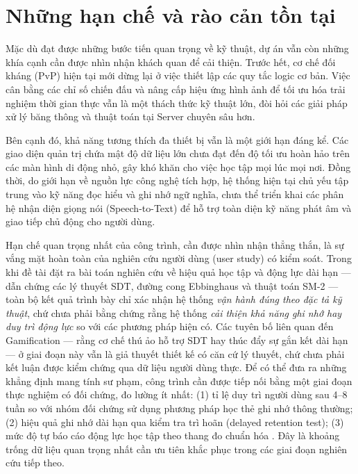 \section{Những hạn chế và rào cản tồn tại}

Mặc dù đạt được những bước tiến quan trọng về kỹ thuật, dự án vẫn còn những khía cạnh cần được nhìn nhận khách quan để cải thiện. Trước hết, cơ chế đối kháng (PvP) hiện tại mới dừng lại ở việc thiết lập các quy tắc logic cơ bản. Việc cân bằng các chỉ số chiến đấu và nâng cấp hiệu ứng hình ảnh để tối ưu hóa trải nghiệm thời gian thực vẫn là một thách thức kỹ thuật lớn, đòi hỏi các giải pháp xử lý băng thông và thuật toán tại Server chuyên sâu hơn.

Bên cạnh đó, khả năng tương thích đa thiết bị vẫn là một giới hạn đáng kể. Các giao diện quản trị chứa mật độ dữ liệu lớn chưa đạt đến độ tối ưu hoàn hảo trên các màn hình di động nhỏ, gây khó khăn cho việc học tập mọi lúc mọi nơi. Đồng thời, do giới hạn về nguồn lực công nghệ tích hợp, hệ thống hiện tại chủ yếu tập trung vào kỹ năng đọc hiểu và ghi nhớ ngữ nghĩa, chưa thể triển khai các phân hệ nhận diện giọng nói (Speech-to-Text) để hỗ trợ toàn diện kỹ năng phát âm và giao tiếp chủ động cho người dùng.

Hạn chế quan trọng nhất của công trình, cần được nhìn nhận thẳng thắn, là sự vắng mặt hoàn toàn của nghiên cứu người dùng (user study) có kiểm soát. Trong khi đề tài đặt ra bài toán nghiên cứu về hiệu quả học tập và động lực dài hạn — dẫn chứng các lý thuyết SDT, đường cong Ebbinghaus và thuật toán SM-2 — toàn bộ kết quả trình bày chỉ xác nhận hệ thống \textit{vận hành đúng theo đặc tả kỹ thuật}, chứ chưa phải bằng chứng rằng hệ thống \textit{cải thiện khả năng ghi nhớ hay duy trì động lực} so với các phương pháp hiện có. Các tuyên bố liên quan đến Gamification — rằng cơ chế thú ảo hỗ trợ SDT hay thúc đẩy sự gắn kết dài hạn — ở giai đoạn này vẫn là giả thuyết thiết kế có căn cứ lý thuyết, chứ chưa phải kết luận được kiểm chứng qua dữ liệu người dùng thực. Để có thể đưa ra những khẳng định mang tính sư phạm, công trình cần được tiếp nối bằng một giai đoạn thực nghiệm có đối chứng, đo lường ít nhất: (1) tỉ lệ duy trì người dùng sau 4--8 tuần so với nhóm đối chứng sử dụng phương pháp học thẻ ghi nhớ thông thường; (2) hiệu quả ghi nhớ dài hạn qua kiểm tra trì hoãn (delayed retention test); (3) mức độ tự báo cáo động lực học tập theo thang đo chuẩn hóa \cite{RyanDeci2017}. Đây là khoảng trống dữ liệu quan trọng nhất cần ưu tiên khắc phục trong các giai đoạn nghiên cứu tiếp theo.

